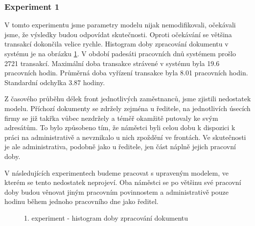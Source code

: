 \documentclass[12pt,a4paper]{article}
\begin{document}
\subsubsection{Experiment 1}
V tomto experimentu jsme parametry modelu nijak nemodifikovali, očekávali jsme, že výsledky budou odpovídat skutečnosti.
Oproti očekávání se většina transakcí dokončila velice rychle.
Histogram doby zpracování dokumentu v systému je na obrázku \ref{exp1_histogram}.
V období padesáti pracovních dnů systémem prošlo 2721 transakcí.
Ma\-xi\-mál\-ní doba trans\-ak\-ce strávené v systému byla 19.6 pracovních hodin.
Průměrná doba vyřízení transakce byla 8.01 pracovních hodin. Standardní odchylka 3.87 hodiny.

Z časového průběhu délek front jednotlivých zaměstnanců, jsme zjistili nedostatek mo\-de\-lu.
Příchozí dokumenty se zdržely zejména u ředitele, na jednotlivích úsecích firmy se již takřka vůbec nezdržely a téměř okamžitě putovaly ke svým adresátům.
To bylo způsobeno tím, že náměstci byli celou dobu k dispozici k práci na administrativě a nevznikalo u nich zpoždění ve frontách.
Ve skutečnosti je ale administrativa, podobně jako u ředitele, jen část náplně jejich pracovní doby.

V následujících experimentech budeme pracovat s upraveným modelem, ve kterém se tento nedostatek neprojeví.
Oba náměstci se po většinu své pracovní doby budou věnovat jiným pracovním povinnostem a administrativě  
pouze hodinu během jednoho pracovního dne jako ředitel.

\begin{figure}[ht]
 \begin{center}
    \caption{1. experiment - histogram doby zpracování dokumentu}
    \label{exp1_histogram}
 \end{center}
\end{figure}
\end{document}
